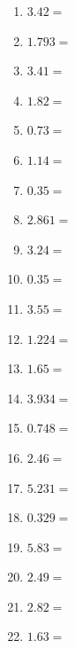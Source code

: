 \documentclass[12pt]{article}
\begin{document}
\begin{enumerate}
\item \large $ 3.42 = $ \vspace{1.5cm}
\item \large $ 1.793 = $ \vspace{1.5cm}
\item \large $ 3.41 = $ \vspace{1.5cm}
\item \large $ 1.82 = $ \vspace{1.5cm}
\item \large $ 0.73 = $ \vspace{1.5cm}
\item \large $ 1.14 = $ \vspace{1.5cm}
\item \large $ 0.35 = $ \vspace{1.5cm}
\item \large $ 2.861 = $ \vspace{1.5cm}
\newpage
\item \large $ 3.24 = $ \vspace{1.5cm}
\item \large $ 0.35 = $ \vspace{1.5cm}
\item \large $ 3.55 = $ \vspace{1.5cm}
\item \large $ 1.224 = $ \vspace{1.5cm}
\item \large $ 1.65 = $ \vspace{1.5cm}
\item \large $ 3.934 = $ \vspace{1.5cm}
\item \large $ 0.748 = $ \vspace{1.5cm}
\item \large $ 2.46 = $ \vspace{1.5cm}
\item \large $ 5.231 = $ \vspace{1.5cm}
\item \large $ 0.329 = $ \vspace{1.5cm}
\newpage
\item \large $ 5.83 = $ \vspace{1.5cm}
\item \large $ 2.49 = $ \vspace{1.5cm}
\item \large $ 2.82 = $ \vspace{1.5cm}
\item \large $ 1.63 = $ \vspace{1.5cm}

\end{enumerate}
\end{document}
